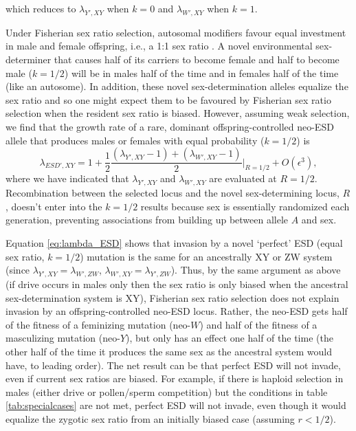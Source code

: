 \documentclass[12pt]{article}
\begin{document}
\noindent
which reduces to $\lambda_{Y',XY}$ when $k=0$ and $\lambda_{W',XY}$ when $k=1$. 

Under Fisherian sex ratio selection, autosomal modifiers favour equal investment in male and female offspring, i.e., a 1:1 sex ratio \citep{Fisher:1930wy,Charnov:1982wg,West:2009we}. 
A novel environmental sex-determiner that causes half of its carriers to become female and half to become male ($k=1/2$) will be in males half of the time and in females half of the time (like an autosome).
In addition, these novel sex-determination alleles equalize the sex ratio and so one might expect them to be favoured by Fisherian sex ratio selection when the resident sex ratio is biased.
However, assuming weak selection, we find that the growth rate of a rare, dominant offspring-controlled neo-ESD allele that produces males or females with equal probability ($k=1/2$) is
\begin{equation}
\lambda_{ESD',XY} =1+ \frac{1}{2}\frac{(\lambda_{Y',XY}-1) + (\lambda_{W',XY}-1)}{2} \Big|_{R=1/2} + O\left(\epsilon^3\right),
\label{eq:lambda_ESD}
\end{equation}
\noindent
where we have indicated that $\lambda_{Y',XY}$ and $\lambda_{W',XY}$ are evaluated at $R=1/2$.
Recombination between the selected locus and the novel sex-determining locus, $R$, doesn't enter into the $k=1/2$ results because sex is essentially randomized each generation, %
preventing associations from building up between allele $A$ and sex.  

Equation \eqref{eq:lambda_ESD} shows that invasion by a novel `perfect' ESD (equal sex ratio, $k=1/2$) mutation is the same for an ancestrally XY or ZW system (since $\lambda_{Y',XY} = \lambda_{W',ZW}$, $\lambda_{W',XY} = \lambda_{Y',ZW}$).
Thus, by the same argument as above (if drive occurs in males only then the sex ratio is only biased when the ancestral sex-determination system is XY), Fisherian sex ratio selection does not explain invasion by an offspring-controlled neo-ESD locus. 
Rather, the neo-ESD gets half of the fitness of a feminizing mutation (neo-$W$) and half of the fitness of a masculizing mutation (neo-$Y$), but only has an effect one half of the time (the other half of the time it produces the same sex as the ancestral system would have, to leading order). 
The net result can be that perfect ESD will not invade, even if current sex ratios are biased. 
For example, if there is haploid selection in males (either drive or pollen/sperm competition) but the conditions in table \ref{tab:specialcases} are not met, perfect ESD will not invade, even though it would equalize the zygotic sex ratio from an initially biased case (assuming $r<1/2$). 
\end{document}
